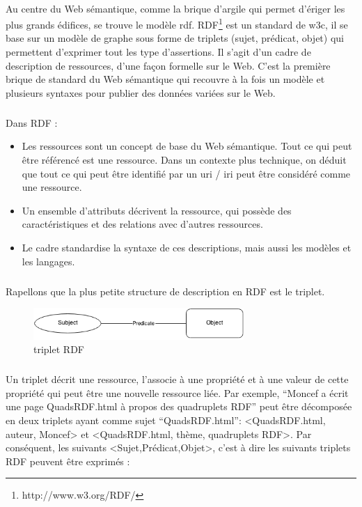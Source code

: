 \documentclass[12pt,a4]{report}
\begin{document}
\paragraph{}
Au centre du Web sémantique, comme la brique d’argile qui permet d’ériger les plus grands édifices, se trouve le modèle \gls{rdf}. RDF\footnote{http://www.w3.org/RDF/} est un standard de \gls{w3c}, il se base sur un modèle de graphe sous forme de triplets (sujet, prédicat, objet) qui permettent d'exprimer tout les type d'assertions. Il s’agit d’un cadre de description de ressources, d’une façon formelle sur le Web.
C’est la première brique de standard du Web sémantique qui recouvre à la fois un modèle et plusieurs syntaxes pour publier des données variées sur le Web.
\subparagraph{}
Dans RDF :
\newline
\begin{itemize}
\item Les ressources sont un concept de base du Web sémantique. Tout ce qui peut être référencé est une ressource. Dans un contexte plus technique, on déduit que tout ce qui peut être identifié par un \gls{uri} / \gls{iri} peut être considéré comme une ressource.
\item Un ensemble d’attributs décrivent la ressource, qui possède des caractéristiques et des relations avec d’autres ressources.
\item Le cadre standardise la syntaxe de ces descriptions, mais aussi les modèles et les langages.
\end{itemize}
\subparagraph{}
Rapellons que la plus petite structure de description en RDF est le triplet.
\begin{figure}[H]
\centering
\centering
\includegraphics[width=8cm]{tripletrdf.png}
\caption{triplet RDF}

\end{figure}
\subparagraph{}
Un triplet décrit une ressource, l’associe à une propriété et à une valeur de cette propriété qui peut être une nouvelle ressource liée. 
\newline
Par exemple, “Moncef a écrit une page QuadsRDF.html à propos des quadruplets RDF” peut être décomposée en deux triplets ayant comme sujet “QuadsRDF.html”: <QuadsRDF.html, auteur, Moncef> et <QuadsRDF.html, thème, quadruplets RDF>.
Par conséquent, les suivants <Sujet,Prédicat,Objet>, c'est à dire les suivants triplets RDF peuvent être exprimés :
\end{document}
